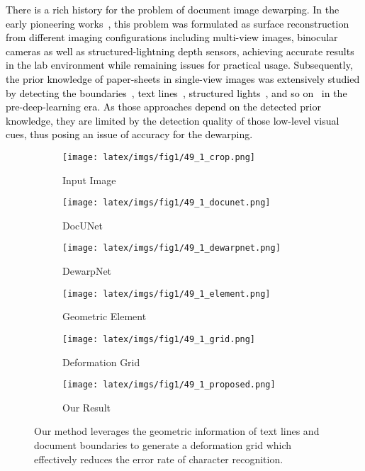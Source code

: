 \documentclass[10pt,twocolumn,letterpaper]{article}
\def\xuef{\textcolor{black}}
\begin{document}
\xuef{
There is a rich history for the problem of document image dewarping. In the early pioneering works~\cite{brown2001document,meng2014active,tian2011rectification}, this problem was formulated as surface reconstruction from different imaging configurations including multi-view images, binocular cameras as well as structured-lightning depth sensors, achieving accurate results in the lab environment while remaining issues for practical usage. Subsequently, the prior knowledge of paper-sheets in single-view images was extensively studied by detecting the boundaries~\cite{brown2006geometric}, text lines~\cite{kil2017robust,kim2015document}, structured lights~\cite{meng2014active}, and so on~\cite{ulges2004document} in the pre-deep-learning era. As those approaches depend on the detected prior knowledge, they are limited by the detection quality of those low-level visual cues, thus posing an issue of accuracy for the dewarping. 
}


\begin{figure}[t]
\centering
\begin{subfigure}[b]{1.0\linewidth}
\centering
    \begin{minipage}[b]{0.32\linewidth}
        \centering
        \texttt{[image: latex/imgs/fig1/49\_1\_crop.png]} 
        \caption{Input Image}
    \end{minipage}   
    \begin{minipage}[b]{0.32\linewidth}
        \centering
        \texttt{[image: latex/imgs/fig1/49\_1\_docunet.png]} 
        \caption{DocUNet~\cite{Ma_2018_CVPR}}
    \end{minipage}  
    \begin{minipage}[b]{0.32\linewidth}
        \centering
        \texttt{[image: latex/imgs/fig1/49\_1\_dewarpnet.png]} 
        \caption{DewarpNet~\cite{Das_2019_ICCV}}
    \end{minipage}  
    \begin{minipage}[b]{0.32\linewidth}
        \centering
        \texttt{[image: latex/imgs/fig1/49\_1\_element.png]} 
        \caption{Geometric Element}
    \end{minipage}   
    \begin{minipage}[b]{0.32\linewidth}
        \centering
        \texttt{[image: latex/imgs/fig1/49\_1\_grid.png]} 
        \caption{Deformation Grid}
    \end{minipage}  
    \begin{minipage}[b]{0.32\linewidth}
        \centering
        \texttt{[image: latex/imgs/fig1/49\_1\_proposed.png]} 
        \caption{Our Result}
    \end{minipage}  
    \vspace{-1em}
\end{subfigure}

\caption{Our method leverages the geometric information of text lines and document boundaries to generate a deformation grid which effectively reduces the error rate of character recognition.}
  \label{fig:fig1}
  \vspace{1em}
\end{figure}
\end{document}
